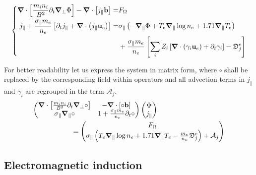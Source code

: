 \begin{equation}
	\label{eq:S3X_vorticityEquation_ElectronInertia}
	\left\{
	\begin{aligned}
		\grad\cdot\left[\frac{m_i n_i}{ B^2}\partial_t\grad_\perp\Phi\right] - \grad\cdot\left[j_\parallel\mathbf{b}\right]=& F_\Omega \\
		j_\parallel + \frac{\sigma_\parallel m_e}{n_e}\left[\partial_t j_\parallel + \grad\cdot\left(j_\parallel\mathbf{u}_e\right)\right] =& \sigma_\parallel \left(-\grad_\parallel\Phi + T_e\grad_\parallel\log n_e + 1.71\grad_\parallel T_e \right) \\ 
		& + \frac{\sigma_\parallel m_e}{n_e}\left[\sum_iZ_i\left[\grad\cdot\left(\gamma_i\mathbf{u}_e \right) + \partial_t \gamma_i\right] - \mathfrak{D}_j^e\right]
	\end{aligned}
	\right.
\end{equation}



For better readability let us express the system in matrix form, where $\circ$ shall be replaced by the corresponding field within operators and all advection terms in $j_\parallel$ and $\gamma_i$ are regrouped in the term $\mathcal{A}_j$. 
\begin{align}
	\makebox[0.8\textwidth][l]{$\displaystyle
		\begin{pmatrix}
			\grad\cdot\left[\frac{m_i n_i}{ B^2}\partial_t\grad_\perp\circ\right] & 
			- \grad\cdot\left[\circ\mathbf{b}\right] \\
			\sigma_\parallel\grad_\parallel\circ &
			1 + \frac{\sigma_\parallel m_e}{n_e}\partial_t \circ
		\end{pmatrix}
		\begin{pmatrix}
			\Phi \\ j_\parallel
		\end{pmatrix}
		$} \nonumber \\	
	\makebox[0.8\textwidth][r]{$\displaystyle
		=\begin{pmatrix}
			F_\Omega \\
			\sigma_\parallel\left(T_e\grad_\parallel\log n_e + 1.71\grad_\parallel T_e - \frac{m_e}{n_e}\mathfrak{D}_j^e \right) + \mathcal{A}_j		
		\end{pmatrix}
		$} \label{eq:S3X_vorticityEquation_ElectronInertia_matrix}
\end{align}






\subsection{Electromagnetic induction}

